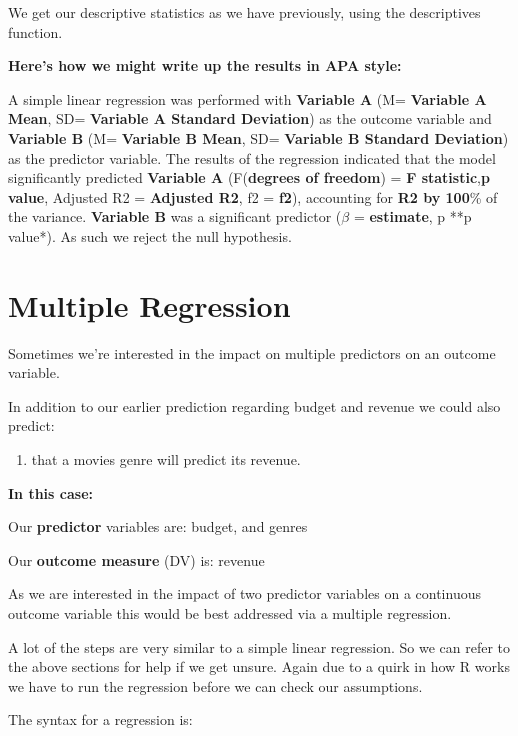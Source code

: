 \documentclass[
]{book}
\providecommand{\tightlist}{%
  \setlength{\itemsep}{0pt}\setlength{\parskip}{0pt}}
\begin{document}
We get our descriptive statistics as we have previously, using the descriptives function.

\textbf{Here's how we might write up the results in APA style:}

A simple linear regression was performed with \textbf{Variable A} (M= \textbf{Variable A Mean}, SD= \textbf{Variable A Standard Deviation}) as the outcome variable and \textbf{Variable B} (M= \textbf{Variable B Mean}, SD= \textbf{Variable B Standard Deviation}) as the predictor variable. The results of the regression indicated that the model significantly predicted \textbf{Variable A} (F(\textbf{degrees of freedom}) = \textbf{F statistic},\textbf{p value}, Adjusted R2 = \textbf{Adjusted R2}, f2 = \textbf{f2}), accounting for \textbf{R2 by 100}\% of the variance. \textbf{Variable B} was a significant predictor (\(\beta\) = \textbf{estimate}, p **p value*). As such we reject the null hypothesis.

\section{Multiple Regression}\label{multiple-regression}

Sometimes we're interested in the impact on multiple predictors on an outcome variable.

In addition to our earlier prediction regarding budget and revenue we could also predict:

\begin{enumerate}
\def\labelenumi{\arabic{enumi})}
\tightlist
\item
  that a movies genre will predict its revenue.
\end{enumerate}

\textbf{In this case:}

Our \textbf{predictor} variables are: budget, and genres

Our \textbf{outcome measure} (DV) is: revenue

As we are interested in the impact of two predictor variables on a continuous outcome variable this would be best addressed via a multiple regression.

A lot of the steps are very similar to a simple linear regression. So we can refer to the above sections for help if we get unsure. Again due to a quirk in how R works we have to run the regression before we can check our assumptions.

The syntax for a regression is:
\end{document}
